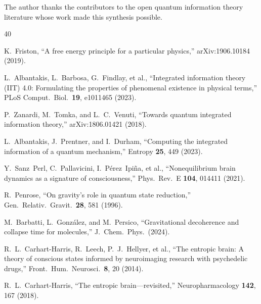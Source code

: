 \documentclass[prl,twocolumn,superscriptaddress,longbibliography,floatfix]{revtex4-2}
\begin{document}
\begin{acknowledgments}
The author thanks the contributors to the open quantum information
theory literature whose work made this synthesis possible.
\end{acknowledgments}


\begin{thebibliography}{40}

K.~Friston,
``A free energy principle for a particular physics,''
arXiv:1906.10184 (2019).

L.~Albantakis, L.~Barbosa, G.~Findlay, et al.,
``Integrated information theory (IIT) 4.0: Formulating the properties
of phenomenal existence in physical terms,''
PLoS Comput.\ Biol.\ \textbf{19}, e1011465 (2023).

P.~Zanardi, M.~Tomka, and L.~C.~Venuti,
``Towards quantum integrated information theory,''
arXiv:1806.01421 (2018).

L.~Albantakis, J.~Prentner, and I.~Durham,
``Computing the integrated information of a quantum mechanism,''
Entropy \textbf{25}, 449 (2023).

Y.~Sanz~Perl, C.~Pallavicini, I.~P\'{e}rez~Ipi\~{n}a, et al.,
``Nonequilibrium brain dynamics as a signature of consciousness,''
Phys.\ Rev.\ E \textbf{104}, 014411 (2021).

R.~Penrose,
``On gravity's role in quantum state reduction,''
Gen.\ Relativ.\ Gravit.\ \textbf{28}, 581 (1996).

M.~Barbatti, L.~Gonz\'{a}lez, and M.~Persico,
``Gravitational decoherence and collapse time for molecules,''
J.\ Chem.\ Phys.\ (2024).

R.~L.~Carhart-Harris, R.~Leech, P.~J.~Hellyer, et al.,
``The entropic brain: A theory of conscious states informed by
neuroimaging research with psychedelic drugs,''
Front.\ Hum.\ Neurosci.\ \textbf{8}, 20 (2014).

R.~L.~Carhart-Harris,
``The entropic brain---revisited,''
Neuropharmacology \textbf{142}, 167 (2018).


\end{thebibliography}
\end{document}
